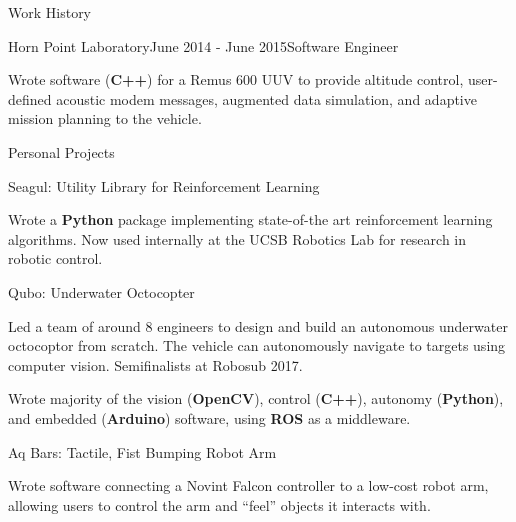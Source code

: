 \documentclass{resume} %
\begin{document}
\begin{rSection}{Work History}
\begin{rSubsection}{Horn Point Laboratory}{June 2014 - June 2015}{Software Engineer}{}
\item Wrote software (\textbf{C++}) for a Remus 600 UUV to provide altitude control, user-defined acoustic modem messages, augmented data simulation, and adaptive mission planning to the vehicle.
\end{rSubsection}

\end{rSection}


\pagebreak

\begin{rSection}{Personal Projects}
  

\begin{rSubsection}{Seagul: Utility Library for Reinforcement Learning}{}{}{}
\item Wrote a \textbf{Python} package implementing state-of-the art reinforcement learning algorithms. Now used internally at the UCSB Robotics Lab for research in robotic control.
\end{rSubsection}

\begin{rSubsection}{Qubo: Underwater Octocopter}{}{}{}
\item Led a team of around 8 engineers to design and build an autonomous underwater octocoptor from scratch. The vehicle can autonomously navigate to targets using computer vision. Semifinalists at Robosub 2017.
\item Wrote majority of the vision (\textbf{OpenCV}), control (\textbf{C++}), autonomy (\textbf{Python}), and embedded (\textbf{Arduino}) software, using \textbf{ROS} as a middleware.
\end{rSubsection}


\begin{rSubsection}{Aq Bars: Tactile, Fist Bumping Robot Arm}{ }{}{}
\item Wrote software connecting a Novint Falcon controller to a low-cost robot arm, allowing users to control the arm and ``feel'' objects it interacts with.
\end{rSubsection}



\end{rSection}
\end{document}
